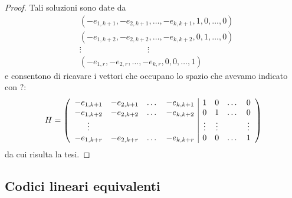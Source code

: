\begin{proof}
   Tali soluzioni sono  date da
   \begin{align*}
      &(-e_{1,k+1}, -e_{2,k+1}, \dots , -e_{k,k+1}, 1, 0 , \dots , 0 ) \\
      &(-e_{1,k+2}, -e_{2,k+2}, \dots , -e_{k,k+2}, 0, 1 , \dots , 0 ) \\
      &\vdots \qquad \qquad \qquad \qquad \vdots \\
      &(-e_{1,r}, -e_{2,r}, \dots , -e_{k,r}, 0, 0 , \dots , 1 )
   \end{align*}
    e consentono di ricavare i vettori che occupano lo spazio che avevamo indicato con $?$:
   \begin{align*}
      H=
      \left(
      \begin{array} {c c c c | c c c c }
      -e_{1,k+1} & -e_{2,k+1} & \dots & -e_{k,k+1} & 1 & 0 & \dots & 0   \\
      -e_{1,k+2} & -e_{2,k+2} & \dots & -e_{k,k+2} & 0 & 1 & \dots & 0   \\
       \vdots & & &  & \vdots & \vdots  &  &  \vdots   \\
      -e_{1,k+r} & -e_{2,k+r} & \dots & -e_{k,k+r} & 0 & 0 & \dots & 1   \\
      \end{array}
      \right)
   \end{align*}
    da cui risulta la tesi.
\end{proof}


\subsection{Codici lineari equivalenti}

